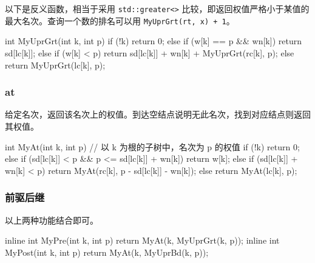以下是反义函数，相当于采用 \texttt{std::greater<>} 比较，即返回权值严格小于某值的最大名次。查询一个数的排名可以用 \texttt{MyUprGrt(rt, x) + 1}。

\begin{cppcode}
int MyUprGrt(int k, int p) {
  if (!k)
    return 0;
  else if (w[k] == p && wn[k])
    return sd[lc[k]];
  else if (w[k] < p)
    return sd[lc[k]] + wn[k] + MyUprGrt(rc[k], p);
  else
    return MyUprGrt(lc[k], p);
}
\end{cppcode}

\subsubsection{at}

给定名次，返回该名次上的权值。到达空结点说明无此名次，找到对应结点则返回其权值。

\begin{cppcode}
int MyAt(int k, int p) {
  // 以 k 为根的子树中，名次为 p 的权值
  if (!k)
    return 0;
  else if (sd[lc[k]] < p && p <= sd[lc[k]] + wn[k])
    return w[k];
  else if (sd[lc[k]] + wn[k] < p)
    return MyAt(rc[k], p - sd[lc[k]] - wn[k]);
  else
    return MyAt(lc[k], p);
}
\end{cppcode}

\subsubsection{前驱后继}

以上两种功能结合即可。

\begin{cppcode}
inline int MyPre(int k, int p) { return MyAt(k, MyUprGrt(k, p)); }
inline int MyPost(int k, int p) { return MyAt(k, MyUprBd(k, p)); }
\end{cppcode}
